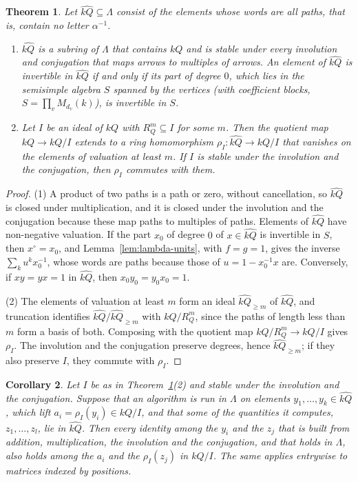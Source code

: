 \documentclass[12pt, a4paper]{report}
\theoremstyle{plain}
\newtheorem{theorem}{Theorem}[chapter]
\newtheorem{corollary}[theorem]{Corollary}
\theoremstyle{definition}
\theoremstyle{remark}
\theoremstyle{plain}
\begin{document}
\begin{theorem}\label{thm:reduction}
Let $\widehat{kQ}\subseteq\Lambda$ consist of the elements whose words are all paths, that is, contain no letter $\alpha^{-1}$.
\begin{enumerate}
  \item $\widehat{kQ}$ is a subring of $\Lambda$ that contains $kQ$ and is stable under every involution and conjugation that maps arrows to multiples of arrows. An element of $\widehat{kQ}$ is invertible in $\widehat{kQ}$ if and only if its part of degree $0$, which lies in the semisimple algebra $S$ spanned by the vertices (with coefficient blocks, $S=\prod_vM_{d_v}(k)$), is invertible in $S$.
  \item Let $I$ be an ideal of $kQ$ with $R_Q^m\subseteq I$ for some $m$. Then the quotient map $kQ\to kQ/I$ extends to a ring homomorphism $\rho_I:\widehat{kQ}\to kQ/I$ that vanishes on the elements of valuation at least $m$. If $I$ is stable under the involution and the conjugation, then $\rho_I$ commutes with them.
\end{enumerate}
\end{theorem}
\begin{proof}
(1) A product of two paths is a path or zero, without cancellation, so $\widehat{kQ}$ is closed under multiplication, and it is closed under the involution and the conjugation because these map paths to multiples of paths. Elements of $\widehat{kQ}$ have non-negative valuation. If the part $x_0$ of degree $0$ of $x\in\widehat{kQ}$ is invertible in $S$, then $x^\circ=x_0$, and Lemma~\ref{lem:lambda-units}, with $f=g=1$, gives the inverse $\sum_ku^kx_0^{-1}$, whose words are paths because those of $u=1-x_0^{-1}x$ are. Conversely, if $xy=yx=1$ in $\widehat{kQ}$, then $x_0y_0=y_0x_0=1$.

(2) The elements of valuation at least $m$ form an ideal $\widehat{kQ}_{\geq m}$ of $\widehat{kQ}$, and truncation identifies $\widehat{kQ}/\widehat{kQ}_{\geq m}$ with $kQ/R_Q^m$, since the paths of length less than $m$ form a basis of both. Composing with the quotient map $kQ/R_Q^m\to kQ/I$ gives $\rho_I$. The involution and the conjugation preserve degrees, hence $\widehat{kQ}_{\geq m}$; if they also preserve $I$, they commute with $\rho_I$.
\end{proof}

\begin{corollary}\label{cor:transfer}
Let $I$ be as in Theorem~\ref{thm:reduction}(2) and stable under the involution and the conjugation. Suppose that an algorithm is run in $\Lambda$ on elements $y_1,\dots,y_k\in\widehat{kQ}$, which lift $a_i=\rho_I(y_i)\in kQ/I$, and that some of the quantities it computes, $z_1,\dots,z_l$, lie in $\widehat{kQ}$. Then every identity among the $y_i$ and the $z_j$ that is built from addition, multiplication, the involution and the conjugation, and that holds in $\Lambda$, also holds among the $a_i$ and the $\rho_I(z_j)$ in $kQ/I$. The same applies entrywise to matrices indexed by positions.
\end{corollary}
\end{document}
